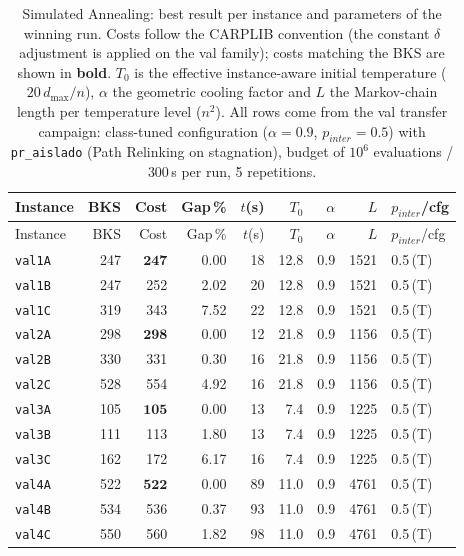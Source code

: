 \begingroup\scriptsize
\begin{longtable}{lrrrrrrrl}
\caption{Simulated Annealing: best result per instance and parameters of the winning run. Costs follow the CARPLIB convention (the constant $\delta$ adjustment is applied on the val family); costs matching the BKS are shown in \textbf{bold}. $T_0$ is the effective instance-aware initial temperature ($20\,d_{\max}/n$), $\alpha$ the geometric cooling factor and $L$ the Markov-chain length per temperature level ($n^2$). All rows come from the val transfer campaign: class-tuned configuration ($\alpha = 0.9$, $p_{inter} = 0.5$) with \texttt{pr\_aislado} (Path Relinking on stagnation), budget of $10^6$ evaluations / 300\,s per run, 5 repetitions.}\label{tab:sa-val-per-instance}\\
\toprule
Instance & BKS & Cost & Gap\,\% & $t$(s) & $T_0$ & $\alpha$ & $L$ & $p_{inter}$/cfg \\
\midrule
\endfirsthead
\toprule
Instance & BKS & Cost & Gap\,\% & $t$(s) & $T_0$ & $\alpha$ & $L$ & $p_{inter}$/cfg \\
\midrule
\endhead
\bottomrule
\endfoot
\texttt{val1A} & 247 & $\mathbf{247}$ & 0.00 & 18 & 12.8 & 0.9 & 1521 & 0.5\,(T) \\
\texttt{val1B} & 247 & 252 & 2.02 & 20 & 12.8 & 0.9 & 1521 & 0.5\,(T) \\
\texttt{val1C} & 319 & 343 & 7.52 & 22 & 12.8 & 0.9 & 1521 & 0.5\,(T) \\
\texttt{val2A} & 298 & $\mathbf{298}$ & 0.00 & 12 & 21.8 & 0.9 & 1156 & 0.5\,(T) \\
\texttt{val2B} & 330 & 331 & 0.30 & 16 & 21.8 & 0.9 & 1156 & 0.5\,(T) \\
\texttt{val2C} & 528 & 554 & 4.92 & 16 & 21.8 & 0.9 & 1156 & 0.5\,(T) \\
\texttt{val3A} & 105 & $\mathbf{105}$ & 0.00 & 13 & 7.4 & 0.9 & 1225 & 0.5\,(T) \\
\texttt{val3B} & 111 & 113 & 1.80 & 13 & 7.4 & 0.9 & 1225 & 0.5\,(T) \\
\texttt{val3C} & 162 & 172 & 6.17 & 16 & 7.4 & 0.9 & 1225 & 0.5\,(T) \\
\texttt{val4A} & 522 & $\mathbf{522}$ & 0.00 & 89 & 11.0 & 0.9 & 4761 & 0.5\,(T) \\
\texttt{val4B} & 534 & 536 & 0.37 & 93 & 11.0 & 0.9 & 4761 & 0.5\,(T) \\
\texttt{val4C} & 550 & 560 & 1.82 & 98 & 11.0 & 0.9 & 4761 & 0.5\,(T) \\

\end{longtable}
